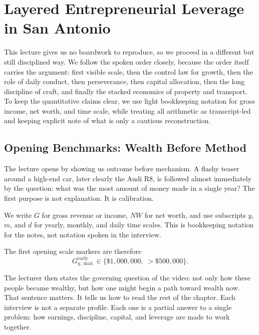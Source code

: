 \chapter{Layered Entrepreneurial Leverage in San Antonio}

This lecture gives us no boardwork to reproduce, so we proceed in a different but still disciplined way. We follow the spoken order closely, because the order itself carries the argument: first visible scale, then the control law for growth, then the role of daily conduct, then perseverance, then capital allocation, then the long discipline of craft, and finally the stacked economics of property and transport. To keep the quantitative claims clear, we use light bookkeeping notation for gross income, net worth, and time scale, while treating all arithmetic as transcript-led and keeping explicit note of what is only a cautious reconstruction.

\section{Opening Benchmarks: Wealth Before Method}

The lecture opens by showing us outcome before mechanism. A flashy teaser around a high-end car, later clearly the Audi R8, is followed almost immediately by the question: what was the most amount of money made in a single year? The first purpose is not explanation. It is calibration.

\begin{definition}
We write \(G\) for gross revenue or income, \(NW\) for net worth, and use subscripts \(y\), \(m\), and \(d\) for yearly, monthly, and daily time scales. This is bookkeeping notation for the notes, not notation spoken in the interview.
\end{definition}

The first opening scale markers are therefore
\begin{equation}
G_{y,\max}^{\mathrm{early}}
\in
\{\$1{,}000{,}000,\;>\$500{,}000\}.
\end{equation}

The lecturer then states the governing question of the video: not only how these people became wealthy, but how one might begin a path toward wealth now. That sentence matters. It tells us how to read the rest of the chapter. Each interview is not a separate profile. Each one is a partial answer to a single problem: how earnings, discipline, capital, and leverage are made to work together.


